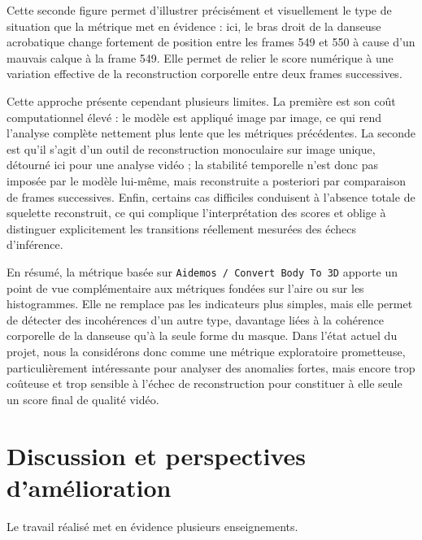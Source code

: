 \documentclass[11pt,a4paper]{article}
\begin{document}
Cette seconde figure permet d'illustrer précisément et visuellement le type de situation que la métrique met en évidence : ici, le bras droit de la danseuse acrobatique change fortement de position entre les frames 549 et 550 à cause d'un mauvais calque à la frame 549.
Elle permet de relier le score numérique à une variation effective de la reconstruction corporelle entre deux frames successives.

\newpage %
Cette approche présente cependant plusieurs limites. La première est son coût computationnel élevé : le modèle est appliqué image par image, ce qui rend l'analyse complète nettement plus lente que les métriques précédentes. La seconde est qu'il s'agit d'un outil de reconstruction monoculaire sur image unique, détourné ici pour une analyse vidéo ; la stabilité temporelle n'est donc pas imposée par le modèle lui-même, mais reconstruite a posteriori par comparaison de frames successives. Enfin, certains cas difficiles conduisent à l'absence totale de squelette reconstruit, ce qui complique l'interprétation des scores et oblige à distinguer explicitement les transitions réellement mesurées des échecs d'inférence.

En résumé, la métrique basée sur \texttt{Aidemos / Convert Body To 3D} apporte un point de vue complémentaire aux métriques fondées sur l'aire ou sur les histogrammes. Elle ne remplace pas les indicateurs plus simples, mais elle permet de détecter des incohérences d'un autre type, davantage liées à la cohérence corporelle de la danseuse qu'à la seule forme du masque. Dans l'état actuel du projet, nous la considérons donc comme une métrique exploratoire prometteuse, particulièrement intéressante pour analyser des anomalies fortes, mais encore trop coûteuse et trop sensible à l'échec de reconstruction pour constituer à elle seule un score final de qualité vidéo.

\newpage

\section{Discussion et perspectives d'amélioration}
Le travail réalisé met en évidence plusieurs enseignements.
\end{document}
